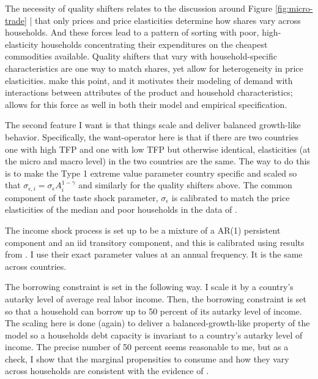 \documentclass[12pt,pdftex]{article}
\begin{document}
\begin{onehalfspacing}
The necessity of quality shifters relates to the discussion around Figure \ref{fig:micro-trade} | that only prices and price elasticities determine how shares vary across households. And these forces lead to a pattern of sorting with poor, high-elasticity households concentrating their expenditures on the cheapest commodities available. Quality shifters that vary with household-specific characteristics are one way to match shares, yet allow for heterogeneity in price elasticities. \citet{berry1995automobile} make this point, and it motivates their modeling of demand with interactions between attributes of the product and household characteristics; \citet{auer2022unequal} allows for this force as well in both their model and empirical specification.

The second feature I want is that things scale and deliver balanced growth-like behavior. Specifically, the want-operator here is that if there are two countries one with high TFP and one with low TFP but otherwise identical, elasticities (at the micro and macro level) in the two countries are the same. The way to do this is to make the Type 1 extreme value parameter country specific and scaled so that $\sigma_{\epsilon,i} = \sigma_{\epsilon} A_i^{1-\gamma}$ and similarly for the quality shifters above. The common component of the taste shock parameter, $\sigma_{\epsilon}$ is calibrated to match the price elasticities of the median and poor households in the data of \citet{auer2022unequal}.

The income shock process is set up to be a mixture of a AR(1) persistent component and an iid transitory component, and this is calibrated using results from \citet{krueger2016macroeconomics}. I use their exact parameter values at an annual frequency. It is the same across countries.

The borrowing constraint is set in the following way. I scale it by a country's autarky level of average real labor income. Then, the borrowing constraint is set so that a household can borrow up to 50 percent of its autarky level of income. The scaling here is done (again) to deliver a balanced-growth-like property of the model so a households debt capacity is invariant to a country's autarky level of income. The precise number of 50 percent seems reasonable to me, but as a check, I show that the marginal propensities to consume and how they vary across households are consistent with the evidence of \citet{kaplan2022marginal}.


\end{onehalfspacing}
\end{document}
